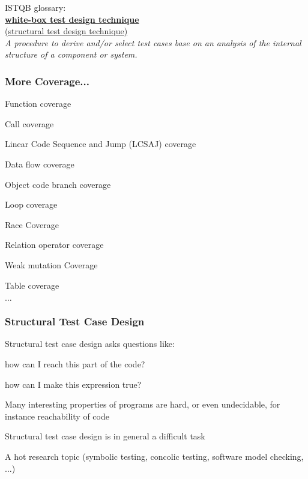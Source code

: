 \begin{itemize*}
	\item ISTQB glossary:\\
	\underline{\textbf{white-box test design technique}}\\
	\underline{(structural test design technique)}\\
	
	\textit{A procedure to derive and/or select test cases base on an analysis of the internal structure of a component or system.}
\end{itemize*}

\subsubsection{More Coverage...}

\begin{itemize*}
	\item Function coverage
	\item Call coverage
	\item Linear Code Sequence and Jump (LCSAJ) coverage
	\item Data flow coverage
	\item Object code branch coverage
	\item Loop coverage
	\item Race Coverage
	\item Relation operator coverage
	\item Weak mutation Coverage
	\item Table coverage
	\item $\ldots$
\end{itemize*}

\subsubsection{Structural Test Case Design}

\begin{itemize*}
	\item Structural test case design asks questions like:
	\begin{itemize*}
		\item how can I reach this part of the code?
		\item how can I make this expression true?
	\end{itemize*}
	\item Many interesting properties of programs are hard, or even
	undecidable, for instance reachability of code
	\item Structural test case design is in general a difficult task
	\item A hot research topic (symbolic testing, concolic testing, software model checking, $\ldots$)
\end{itemize*}